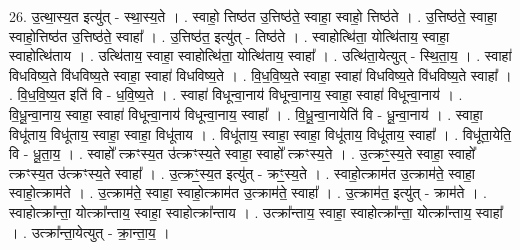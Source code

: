 \documentclass[17pt]{extarticle}
\begin{document}
26. उ॒त्था॒स्य॒त इत्यु॑त् - स्था॒स्य॒ते । . स्वाहो॒ त्तिष्ठ॑त उ॒त्तिष्ठ॑ते॒ स्वाहा॒ स्वाहो॒ त्तिष्ठ॑ते । . उ॒त्तिष्ठ॑ते॒ स्वाहा॒ स्वाहो॒त्तिष्ठ॑त उ॒त्तिष्ठ॑ते॒ स्वाहा᳚ । . उ॒त्तिष्ठ॑त॒ इत्यु॑त् - तिष्ठ॑ते । . स्वाहोत्थि॑ता॒ योत्थि॑ताय॒ स्वाहा॒ स्वाहोत्थि॑ताय । . उत्थि॑ताय॒ स्वाहा॒ स्वाहोत्थि॑ता॒ योत्थि॑ताय॒ स्वाहा᳚ । . उत्थि॑ता॒येत्युत् - स्थि॒ता॒य॒ । . स्वाहा॑ विधविष्य॒ते वि॑धविष्य॒ते स्वाहा॒ स्वाहा॑ विधविष्य॒ते । . वि॒ध॒वि॒ष्य॒ते स्वाहा॒ स्वाहा॑ विधविष्य॒ते वि॑धविष्य॒ते स्वाहा᳚ । . वि॒ध॒वि॒ष्य॒त इति॑ वि - ध॒वि॒ष्य॒ते । . स्वाहा॑ विधून्वा॒नाय॑ विधून्वा॒नाय॒ स्वाहा॒ स्वाहा॑ विधून्वा॒नाय॑ । . वि॒धू॒न्वा॒नाय॒ स्वाहा॒ स्वाहा॑ विधून्वा॒नाय॑ विधून्वा॒नाय॒ स्वाहा᳚ । . वि॒धू॒न्वा॒नायेति॑ वि - धू॒न्वा॒नाय॑ । . स्वाहा॒ विधू॑ताय॒ विधू॑ताय॒ स्वाहा॒ स्वाहा॒ विधू॑ताय । . विधू॑ताय॒ स्वाहा॒ स्वाहा॒ विधू॑ताय॒ विधू॑ताय॒ स्वाहा᳚ । . विधू॑ता॒येति॒ वि - धू॒ता॒य॒ । . स्वाहो᳚ त्क्रꣳस्य॒त उ॑त्क्रꣳस्य॒ते स्वाहा॒ स्वाहो᳚ त्क्रꣳस्य॒ते । . उ॒त्क्रꣳ॒॒स्य॒ते स्वाहा॒ स्वाहो᳚ त्क्रꣳस्य॒त उ॑त्क्रꣳस्य॒ते स्वाहा᳚ । . उ॒त्क्रꣳ॒॒स्य॒त इत्यु॑त् - क्रꣳ॒॒स्य॒ते । . स्वाहो॒त्क्राम॑त उ॒त्क्राम॑ते॒ स्वाहा॒ स्वाहो॒त्क्राम॑ते । . उ॒त्क्राम॑ते॒ स्वाहा॒ स्वाहो॒त्क्राम॑त उ॒त्क्राम॑ते॒ स्वाहा᳚ । . उ॒त्क्राम॑त॒ इत्यु॑त् - क्राम॑ते । . स्वाहोत्क्रा᳚न्ता॒ योत्क्रा᳚न्ताय॒ स्वाहा॒ स्वाहोत्क्रा᳚न्ताय । . उत्क्रा᳚न्ताय॒ स्वाहा॒ स्वाहोत्क्रा᳚न्ता॒ योत्क्रा᳚न्ताय॒ स्वाहा᳚ । . उत्क्रा᳚न्ता॒येत्युत् - क्रा॒न्ता॒य॒ । \newline
\end{document}
